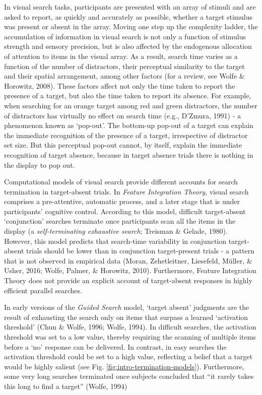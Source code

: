 \documentclass[12pt,twoside]{reedthesis}
\begin{document}
In visual search tasks, participants are presented with an array of stimuli and are asked to report, as quickly and accurately as possible, whether a target stimulus was present or absent in the array. Moving one step up the complexity ladder, the accumulation of information in visual search is not only a function of stimulus strength and sensory precision, but is also affected by the endogenous allocation of attention to items in the visual array. As a result, search time varies as a function of the number of distractors, their perceptual similarity to the target and their spatial arrangement, among other factors (for a review, see Wolfe \& Horowitz, 2008). These factors affect not only the time taken to report the presence of a target, but also the time taken to report its absence. For example, when searching for an orange target among red and green distractors, the number of distractors has virtually no effect on search time (e.g., D'Zmura, 1991) - a phenomenon known as `pop-out'. The bottom-up pop-out of a target can explain the immediate recognition of the presence of a target, irrespective of distractor set size. But this perceptual pop-out cannot, by itself, explain the immediate recognition of target absence, because in target absence trials there is nothing in the display to pop out.

Computational models of visual search provide different accounts for search termination in target-absent trials. In \emph{Feature Integration Theory}, visual search comprises a pre-attentive, automatic process, and a later stage that is under participants' cognitive control. According to this model, difficult target-absent `conjunction' searches terminate once participants scan all the items in the display (a \emph{self-terminating exhaustive search}; Treisman \& Gelade, 1980). However, this model predicts that search-time variability in conjunction target-absent trials should be lower than in conjunction target-present trials - a pattern that is not observed in empirical data (Moran, Zehetleitner, Liesefeld, Müller, \& Usher, 2016; Wolfe, Palmer, \& Horowitz, 2010). Furthermore, Feature Integration Theory does not provide an explicit account of target-absent responses in highly efficient parallel searches.

In early versions of the \emph{Guided Search} model, `target absent' judgments are the result of exhausting the search only on items that surpass a learned `activation threshold' (Chun \& Wolfe, 1996; Wolfe, 1994). In difficult searches, the activation threshold was set to a low value, thereby requiring the scanning of multiple items before a `no' response can be delivered. In contrast, in easy searches the activation threshold could be set to a high value, reflecting a belief that a target would be highly salient (see Fig. \ref{fig:intro-termination-models}). Furthermore, some very long searches terminated once subjects concluded that ``it rarely takes this long to find a target'' (Wolfe, 1994)
\end{document}
